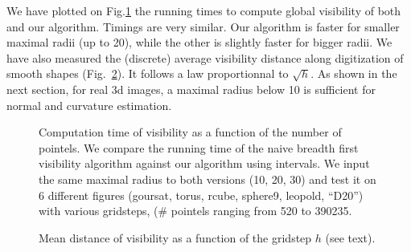 
We have plotted on Fig.\ref{fig:meanvisibility-computationComplexity}
the running times to compute global visibility of both \cite[Algorithm
  3]{lachaud:2022-jmiv} and our algorithm. Timings are very
similar. Our algorithm is faster for smaller maximal radii (up to 20),
while the other is slightly faster for bigger radii. We have also
measured the (discrete) average visibility distance along digitization
of smooth shapes (Fig.~\ref{fig:meanvisibility-gridstep}). It follows
a law proportionnal to $\sqrt{h}$. As shown in the next section, for
real 3d images, a maximal radius below 10 is sufficient for normal and
curvature estimation.


\begin{figure}[t]
  \centering
  
  \caption{ \label{fig:meanvisibility-computationComplexity}Computation
    time of visibility as a function of the number of pointels. We
    compare the running time of the naive breadth first visibility
    algorithm against our algorithm using intervals. We input the same
    maximal radius to both versions (10, 20, 30) and test it on 6
    different figures (goursat, torus, rcube, sphere9, leopold,
    ``D20'') with various gridsteps, ($\#$ pointels ranging from 520
    to 390235.}
\end{figure}

\begin{figure}
  \centering
  
  \caption{\label{fig:meanvisibility-gridstep} Mean distance of visibility as a function of the gridstep $h$ (see text).}
\end{figure}
